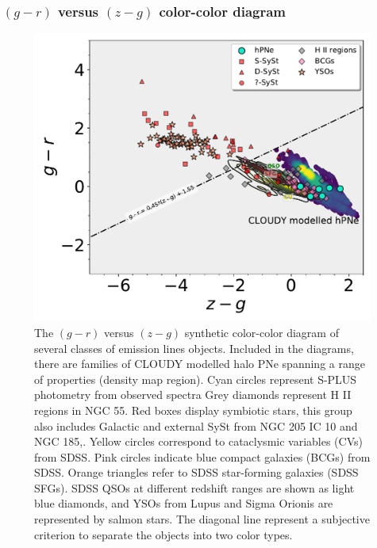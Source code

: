 \documentclass[fleqn,usenatbib]{mnras}
\begin{document}
\subsubsection{$(g - r)$ versus $(z - g)$ color-color diagram}

\begin{figure}
	\includegraphics[width=0.9\linewidth]{Figs/Fig-SPLUS-gr-zg.pdf}
        \caption{The $(g - r)$ versus $(z - g)$ synthetic color-color diagram of
          several classes of emission lines objects. Included in the diagrams, there
          are families of CLOUDY modelled halo PNe spanning a range of properties (density
          map region). Cyan circles represent S-PLUS photometry from observed spectra
          Grey diamonds represent H II regions in NGC 55. Red
          boxes display symbiotic stars, this group also includes Galactic and
          external SySt from NGC 205 IC 10 and NGC 185,. Yellow circles correspond to
          cataclysmic variables (CVs) from SDSS. Pink circles indicate  blue compact
          galaxies (BCGs) from SDSS. Orange triangles refer to SDSS
          star-forming galaxies (SDSS SFGs). SDSS QSOs at different redshift
          ranges are shown as light blue diamonds, and YSOs from Lupus and
          Sigma Orionis are represented by salmon stars. The diagonal line represent
         a subjective criterion to separate the objects into two color types.}
    \label{fig:synthetic}
\end{figure}
\end{document}
